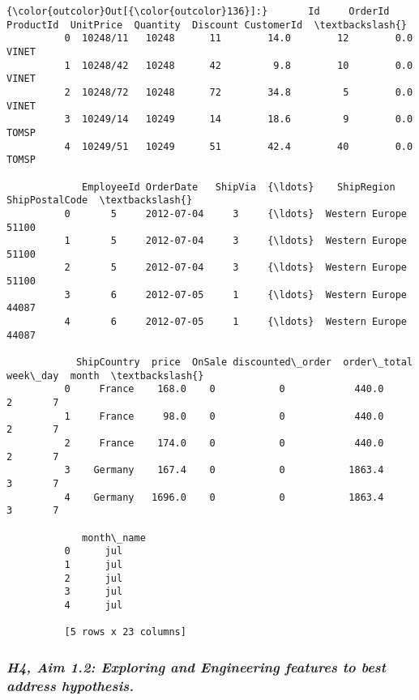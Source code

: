 \documentclass[11pt]{article}
\begin{document}
\begin{Verbatim}[commandchars=\\\{\}]
{\color{outcolor}Out[{\color{outcolor}136}]:}       Id     OrderId  ProductId  UnitPrice  Quantity  Discount CustomerId  \textbackslash{}
          0  10248/11   10248      11        14.0        12        0.0      VINET     
          1  10248/42   10248      42         9.8        10        0.0      VINET     
          2  10248/72   10248      72        34.8         5        0.0      VINET     
          3  10249/14   10249      14        18.6         9        0.0      TOMSP     
          4  10249/51   10249      51        42.4        40        0.0      TOMSP     
          
             EmployeeId OrderDate   ShipVia  {\ldots}    ShipRegion   ShipPostalCode  \textbackslash{}
          0       5     2012-07-04     3     {\ldots}  Western Europe      51100       
          1       5     2012-07-04     3     {\ldots}  Western Europe      51100       
          2       5     2012-07-04     3     {\ldots}  Western Europe      51100       
          3       6     2012-07-05     1     {\ldots}  Western Europe      44087       
          4       6     2012-07-05     1     {\ldots}  Western Europe      44087       
          
            ShipCountry  price  OnSale discounted\_order  order\_total  week\_day  month  \textbackslash{}
          0     France    168.0    0           0            440.0         2       7     
          1     France     98.0    0           0            440.0         2       7     
          2     France    174.0    0           0            440.0         2       7     
          3    Germany    167.4    0           0           1863.4         3       7     
          4    Germany   1696.0    0           0           1863.4         3       7     
          
             month\_name  
          0      jul     
          1      jul     
          2      jul     
          3      jul     
          4      jul     
          
          [5 rows x 23 columns]
\end{Verbatim}
            
    \hypertarget{h4-aim-1.2-exploring-and-engineering-features-to-best-address-hypothesis.}{%
\subsubsection{\texorpdfstring{\textbf{\emph{H4, Aim 1.2: Exploring and
Engineering features to best address
hypothesis.}}}{H4, Aim 1.2: Exploring and Engineering features to best address hypothesis.}}\label{h4-aim-1.2-exploring-and-engineering-features-to-best-address-hypothesis.}}
\end{document}
